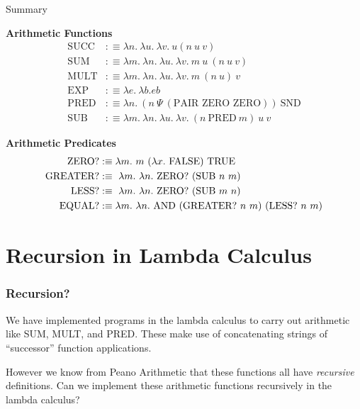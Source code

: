 \documentclass{beamer}
\begin{document}
\begin{frame}{Summary}
  
  {\bf Arithmetic Functions}
  \begin{align*}
      \text{SUCC} &:\equiv \lambda n. \ \lambda u. \ \lambda v. \ u(n \ u \ v) \\
      \text{SUM} &:\equiv \lambda m. \ \lambda n. \ \lambda u. \ \lambda v. \ m \ u\ (n \ u \ v)\\
      \text{MULT} &:\equiv \lambda m. \ \lambda n. \ \lambda u. \ \lambda v. \ m \ (n \ u) \ v \\
      \text{EXP} &:\equiv \lambda e. \ \lambda b. eb \ \\
      \text{PRED} &:\equiv \lambda n.  \ (n \ \Psi \ (\text{PAIR ZERO ZERO})) \ \text{SND}  \\
      \text{SUB} &:\equiv \lambda m. \ \lambda n. \ \lambda u. \ \lambda v. \ (n \ \text{PRED} \ m) \ u \ v
  \end{align*}
  
  {\bf Arithmetic Predicates}
  \begin{align*}
      \text{ZERO?} &:\equiv \lambda m. \ m \ (\lambda x. \ \FALSE) \ \TRUE \ \\
      \text{GREATER?} &:\equiv \ \lambda m. \ \lambda n. \ \text{ZERO?} \ (\text{SUB} \ n \ m) \\
      \text{LESS?} &:\equiv \ \lambda m. \ \lambda n. \ \text{ZERO?} \ (\text{SUB} \ m \ n) \\
      \text{EQUAL?} &:\equiv \lambda m. \ \lambda n. \ \AND \ (\text{GREATER?} \ n \ m) \ (\text{LESS?} \ n \ m) 
  \end{align*}      
\end{frame}

\section{Recursion in Lambda Calculus}

\begin{frame}
  \frametitle{Recursion?}

  We have implemented programs in the lambda calculus to carry out arithmetic like SUM, MULT, and PRED. These make use of concatenating strings of ``successor'' function applications. 
  
  \vspace{0.2cm}

  However we know from Peano Arithmetic that these functions all have \emph{recursive} definitions. Can we implement these arithmetic functions recursively in the lambda calculus?

\end{frame}
\end{document}
